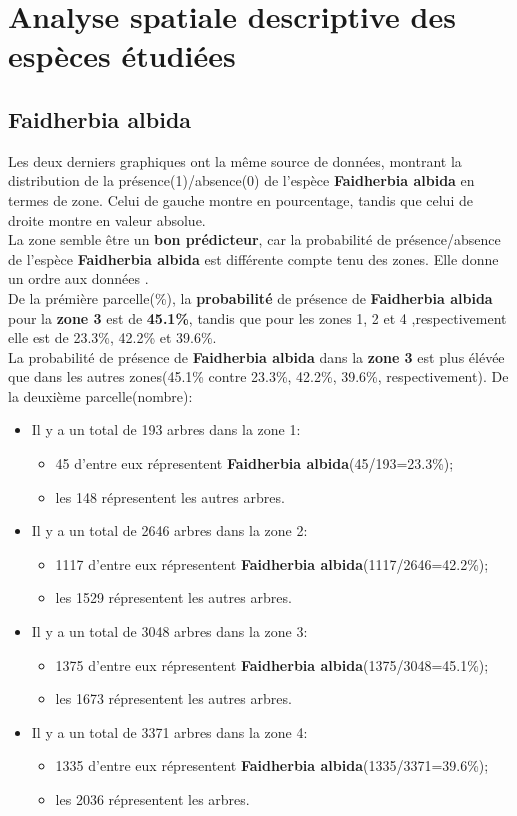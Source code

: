 \documentclass[a4paper, oneside, 12pt]{book}
\begin{document}
\section{Analyse spatiale descriptive des espèces étudiées}
\subsection{Faidherbia albida}
Les deux derniers graphiques ont la même source de données, montrant la distribution de la présence(1)/absence(0) de l'espèce \textbf{Faidherbia albida} en termes de zone. Celui de gauche montre en pourcentage, tandis que celui de droite montre en valeur absolue.\\
La zone semble être un \textbf{bon prédicteur}, car la probabilité de présence/absence de l'espèce \textbf{Faidherbia albida} est différente compte tenu des zones. Elle donne un ordre aux données .\\
De la prémière parcelle(\%), la \textbf{probabilité} de présence de \textbf{Faidherbia albida} pour la \textbf{zone 3} est de \textbf{45.1\%}, tandis que pour les zones 1, 2 et 4 ,respectivement elle est de 23.3\%, 42.2\% et 39.6\%. \\
La probabilité de présence de \textbf{Faidherbia albida} dans la \textbf{zone 3} est plus élévée que dans les autres zones(45.1\% contre 23.3\%, 42.2\%, 39.6\%, respectivement).
De la deuxième parcelle(nombre):
\begin{itemize}
	\item Il y a un total de 193 arbres dans la zone 1:
	\begin{itemize}
		\item 45 d'entre eux répresentent \textbf{Faidherbia albida}(45/193=23.3\%);
		\item les 148 répresentent les autres arbres.
	\end{itemize}
	\item Il y a un total de 2646 arbres dans la zone 2:
	\begin{itemize}
		\item 1117 d'entre eux répresentent \textbf{Faidherbia albida}(1117/2646=42.2\%);
		\item les 1529 répresentent les autres arbres.
	\end{itemize}
	\item Il y a un total de 3048 arbres dans la zone 3:
	\begin{itemize}
		\item 1375 d'entre eux répresentent \textbf{Faidherbia albida}(1375/3048=45.1\%);
		\item les 1673 répresentent les autres arbres.
	\end{itemize}
	\item Il y a un total de 3371 arbres dans la zone 4:
	\begin{itemize}
		\item 1335 d'entre eux répresentent \textbf{Faidherbia albida}(1335/3371=39.6\%);
		\item les 2036 répresentent les arbres.
	\end{itemize}
\end{itemize}
\end{document}
